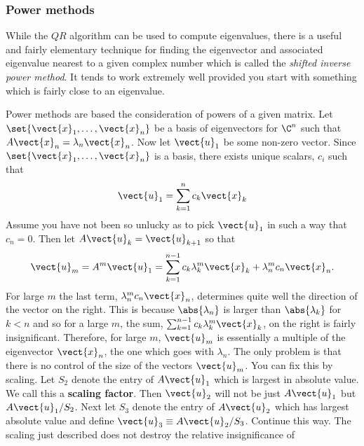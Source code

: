 \subsubsection{Power methods}

While the $QR$ algorithm can be used to compute eigenvalues, there is a useful and fairly elementary technique for
finding the eigenvector and associated eigenvalue nearest to a given complex number which
is called the {\em shifted inverse power method}. It tends to work extremely well provided you
start with something which is fairly close to an eigenvalue.

Power methods are based the consideration of powers of a given matrix. Let $
\set{
\vect{x}_{1},\ldots,\vect{x}_{n}} $ be a basis of eigenvectors for $
\C^{n}$ such that $A\vect{x}_{n}=\lambda _{n}\vect{x}_{n}$. Now let $
\vect{u}_{1}$ be some non-zero vector. Since $\set{\vect{x}_{1},\ldots,\vect{x}_{n}} $ is a basis, there exists unique scalars, $c_{i}$ such that
\begin{equation*}
\vect{u}_{1}=\sum_{k=1}^{n}c_{k}\vect{x}_{k}
\end{equation*}
Assume you have not been so unlucky as to pick $\vect{u}_{1}$ in such a way
that $c_{n}=0$. Then let $A\vect{u}_{k}=\vect{u}_{k+1}$ so that
\begin{equation}
\vect{u}_{m}=A^{m}\vect{u}_{1}=\sum_{k=1}^{n-1}c_{k}\lambda _{k}^{m}\vect{x}
_{k}+\lambda _{n}^{m}c_{n}\vect{x}_{n}.  \label{20-may-e1}
\end{equation}
For large $m$ the last term, $\lambda _{n}^{m}c_{n}\vect{x}_{n}$, determines
quite well the direction of the vector on the right. This is because $
\abs{\lambda _{n}}$ is larger than $\abs{\lambda
_{k}}$ for $k<n$ and so for a large $m$, the sum, $\sum_{k=1}^{n-1}c_{k}\lambda _{k}^{m}\vect{x}_{k}$, on the right is fairly
insignificant. Therefore, for large $m$, $\vect{u}_{m}$ is essentially a
multiple of the eigenvector $\vect{x}_{n}$, the one which goes with $\lambda
_{n}$. The only problem is that there is no control of the size of the
vectors $\vect{u}_{m}$. You can fix this by scaling. Let $S_{2}$ denote the
entry of $A\vect{u}_{1}$ which is largest in absolute value. We call this a
 \textbf{scaling factor}. Then $\vect{u}_{2}$ will not be just $A\vect{u}_{1}$ but $A\vect{u}_{1}/S_{2}$. Next
let $S_{3}$ denote the entry of $A\vect{u}_{2}$ which has largest absolute
value and define $\vect{u}_{3}\equiv A\vect{u}_{2}/S_{3}$. Continue this way.
The scaling just described does not destroy the relative insignificance of
